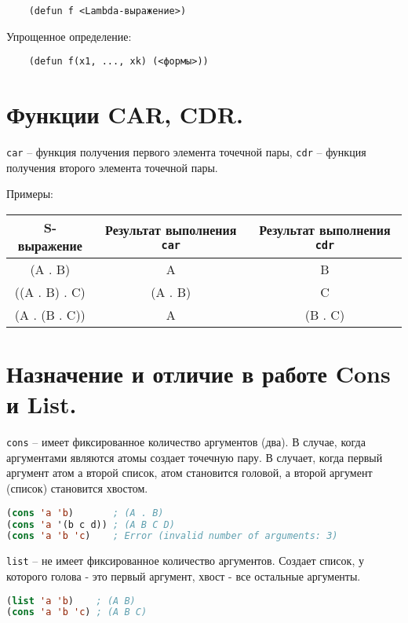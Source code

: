 \begin{lstlisting}
	(defun f <Lambda-выражение>)
\end{lstlisting}

Упрощенное определение:

\begin{lstlisting}
	(defun f(x1, ..., xk) (<формы>))
\end{lstlisting}


\section{Функции CAR, CDR.}

\texttt{car} -- функция получения первого элемента точечной пары, \texttt{cdr} -- функция получения второго элемента точечной пары.

Примеры:

\begin{center}
    \begin{tabular}{ |c|c|c| } 
        \hline
            S-выражение & Результат выполнения \texttt{car} & Результат выполнения \texttt{cdr} \\ 
        \hline
        \hline
            (A . B) & A & B \\ 
        \hline
            ((A . B) . C) & (A . B) & C \\ 
		\hline
			(A . (B . C)) & A & (B . C) \\ 
        \hline
    \end{tabular}
\end{center}


\section{Назначение и отличие в работе Cons и List.}

\texttt{cons} -- имеет фиксированное количество аргументов (два). 
В случае, когда аргументами являются атомы создает точечную пару. В случает, когда первый аргумент атом а второй список, атом становится головой, а второй аргумент (список) становится хвостом. 

\begin{lstlisting}[language=Lisp]
(cons 'a 'b) 	   ; (A . B)
(cons 'a '(b c d)) ; (A B C D)
(cons 'a 'b 'c)    ; Error (invalid number of arguments: 3)
\end{lstlisting}



\texttt{list} -- не имеет фиксированное количество аргументов. 
Создает список, у которого голова - это первый аргумент, хвост - все остальные аргументы.

\begin{lstlisting}[language=Lisp]
(list 'a 'b)    ; (A B)
(cons 'a 'b 'c) ; (A B C)
\end{lstlisting}

